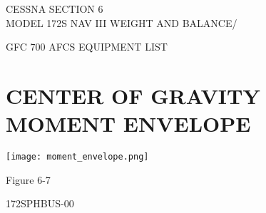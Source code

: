 \documentclass[a4paper, 11pt]{article}
\begin{document}
\noindent
CESSNA                        \hfill SECTION 6 \\ \normalsize
MODEL 172S NAV III  \hfill WEIGHT AND BALANCE/ \par
GFC 700 AFCS             \hfill EQUIPMENT LIST

\section*{\centering CENTER OF GRAVITY MOMENT ENVELOPE}

\texttt{[image: moment\_envelope.png]}

\vspace{0cm}
\begin{center}Figure 6-7\end{center}
172SPHBUS-00
\end{document}
